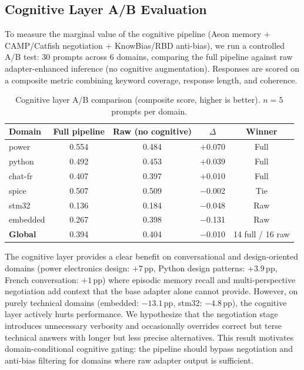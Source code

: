 \documentclass[11pt,a4paper]{article}
\begin{document}
\subsection{Cognitive Layer A/B Evaluation}

To measure the marginal value of the cognitive pipeline (Aeon memory + CAMP/Catfish negotiation + KnowBias/RBD anti-bias), we run a controlled A/B test: 30 prompts across 6 domains, comparing the full pipeline against raw adapter-enhanced inference (no cognitive augmentation). Responses are scored on a composite metric combining keyword coverage, response length, and coherence.

\begin{table}[h]
\centering
\caption{Cognitive layer A/B comparison (composite score, higher is better). $n{=}5$ prompts per domain.}
\label{tab:cognitive-ab}
\begin{tabular}{lcccc}
\toprule
\textbf{Domain} & \textbf{Full pipeline} & \textbf{Raw (no cognitive)} & \textbf{$\Delta$} & \textbf{Winner} \\
\midrule
power & 0.554 & 0.484 & $+$0.070 & Full \\
python & 0.492 & 0.453 & $+$0.039 & Full \\
chat-fr & 0.407 & 0.397 & $+$0.010 & Full \\
spice & 0.507 & 0.509 & $-$0.002 & Tie \\
stm32 & 0.136 & 0.184 & $-$0.048 & Raw \\
embedded & 0.267 & 0.398 & $-$0.131 & Raw \\
\midrule
\textbf{Global} & 0.394 & 0.404 & $-$0.010 & 14 full / 16 raw \\
\bottomrule
\end{tabular}
\end{table}

The cognitive layer provides a clear benefit on conversational and design-oriented domains (power electronics design: $+7$\,pp, Python design patterns: $+3.9$\,pp, French conversation: $+1$\,pp) where episodic memory recall and multi-perspective negotiation add context that the base adapter alone cannot provide. However, on purely technical domains (embedded: $-13.1$\,pp, stm32: $-4.8$\,pp), the cognitive layer actively hurts performance. We hypothesize that the negotiation stage introduces unnecessary verbosity and occasionally overrides correct but terse technical answers with longer but less precise alternatives. This result motivates domain-conditional cognitive gating: the pipeline should bypass negotiation and anti-bias filtering for domains where raw adapter output is sufficient.
\end{document}
